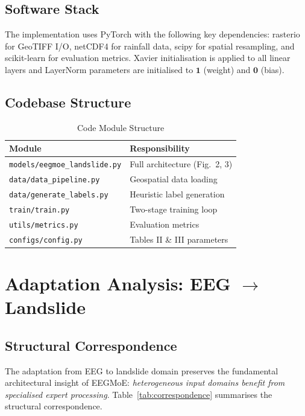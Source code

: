 \documentclass[conference]{IEEEtran}
\begin{document}
\subsection{Software Stack}

The implementation uses PyTorch with the following key dependencies: rasterio for GeoTIFF I/O, netCDF4 for rainfall data, scipy for spatial resampling, and scikit-learn for evaluation metrics. Xavier initialisation is applied to all linear layers and LayerNorm parameters are initialised to $\mathbf{1}$ (weight) and $\mathbf{0}$ (bias).

\subsection{Codebase Structure}

\begin{table}[h]
\centering
\caption{Code Module Structure}
\label{tab:codebase}
\begin{tabular}{@{}ll@{}}
\toprule
\textbf{Module} & \textbf{Responsibility} \\
\midrule
\texttt{models/eegmoe\_landslide.py} & Full architecture (Fig.~2, 3) \\
\texttt{data/data\_pipeline.py} & Geospatial data loading \\
\texttt{data/generate\_labels.py} & Heuristic label generation \\
\texttt{train/train.py} & Two-stage training loop \\
\texttt{utils/metrics.py} & Evaluation metrics \\
\texttt{configs/config.py} & Tables II \& III parameters \\
\bottomrule
\end{tabular}
\end{table}

\section{Adaptation Analysis: EEG $\rightarrow$ Landslide}

\subsection{Structural Correspondence}

The adaptation from EEG to landslide domain preserves the fundamental architectural insight of EEGMoE: \textit{heterogeneous input domains benefit from specialised expert processing}. Table~\ref{tab:correspondence} summarises the structural correspondence.
\end{document}

